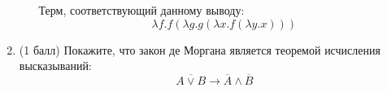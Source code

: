\begin{enumerate}
\begin{itemize}
\begin{solution}
\begin{prooftree}
      \end{prooftree}
      Терм, соответствующий данному выводу:
      \begin{equation}
        \lambda f. f (\lambda g. g (\lambda x . f (\lambda y . x)))
      \end{equation}
    \end{solution}
  \end{itemize}
  \item (1 балл) Покажите, что закон де Моргана является теоремой исчисления высказываний:
  $$\overline{A \lor B} \rightarrow \overline{A} \land \overline{B}$$
\end{enumerate}
\clearpage
